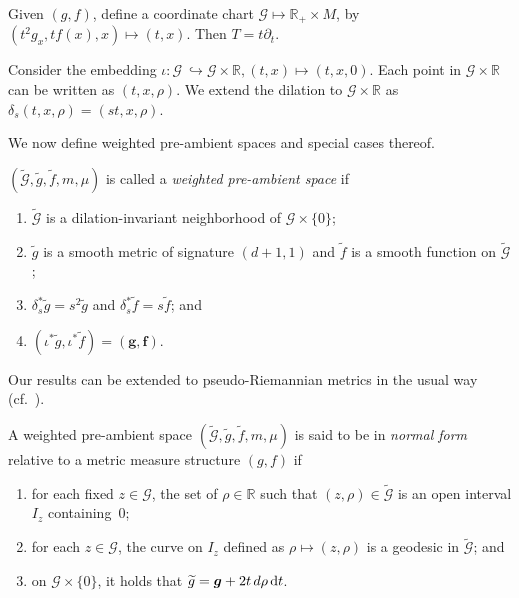 \documentclass[11pt]{article}
\numberwithin{equation}{section}
\newcommand{\cg}{\widetilde{g}}
\newcommand{\cf}{\widetilde{f}}
\newcommand{\cmG}{\widetilde{\mathcal{G}}}
\newcommand{\mG}{\mathcal{G}}
\newcommand{\bR}{\mathbb{R}}
\numberwithin{equation}{section}
\begin{document}
Given $(g,f)$, define a coordinate chart $\mG\mapsto \bR_+\times M$, by $(t^2g_x,tf(x),x)\mapsto (t,x)$. Then $T=t\partial_t$.

Consider the embedding $\iota \colon \mG\ \hookrightarrow \mG\times\bR,(t,x)\mapsto (t,x,0)$. Each point in $\mG\times\bR$ can be written as $(t,x,\rho)$. We extend the dilation to $\mathcal{G}\times \bR$ as $\delta_s (t,x,\rho)= (st,x,\rho)$.

We now define weighted pre-ambient spaces and special cases thereof.

\begin{Definition}
$(\cmG,\cg,\cf,m,\mu)$ is called a \emph{weighted pre-ambient space} if
\begin{enumerate}[label=$(\roman*)$]\itemsep=0pt
 \item $\cmG$ is a dilation-invariant neighborhood of $\mG\times \{0\}$;
 \item $\cg$ is a smooth metric of signature $(d+1,1)$ and $\widetilde{f}$ is a smooth function on $\cmG$;
 \item $\delta_s^*\widetilde{g}=s^2 \widetilde{g}$ and $\delta_s^*\widetilde{f}=s\widetilde{f}$; and
 \item $(\iota^*\widetilde{g},\iota^*\widetilde{f})=(\boldsymbol{g},\boldsymbol{f})$.
\end{enumerate}
\end{Definition}

\begin{Remark}
Our results can be extended to pseudo-Riemannian metrics in the usual way (cf.~\cite{FeffermanGraham2012}).
\end{Remark}

\begin{Definition}
A weighted pre-ambient space $(\cmG,\cg,\cf,m,\mu)$ is said to be in \emph{normal form} relative to a metric measure structure $(g,f)$ if
\begin{enumerate}[label=$(\roman*)$]\itemsep=0pt
 \item for each fixed $z\in\mG$, the set of $\rho\in\bR$ such that $(z,\rho)\in \cmG$ is an open interval $I_z$ containing~$0$;
 \item for each $z\in\mG$, the curve on $I_z$ defined as $\rho\mapsto(z,\rho)$ is a geodesic in $\cmG$; and
 \item on $\mG\times \{0\}$, it holds that $\cg=\boldsymbol{g} + 2t\,{\rm d}\rho\,\mathrm{d}t$.
\end{enumerate}
\end{Definition}
\end{document}
